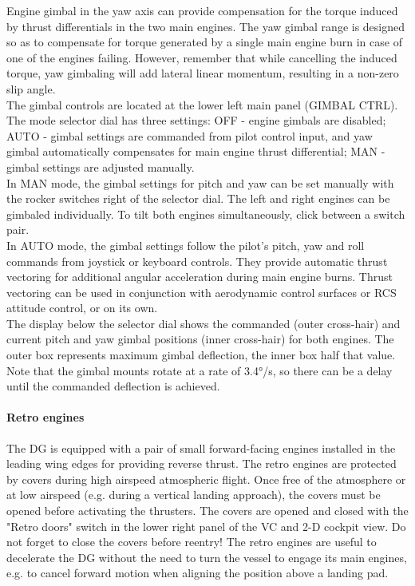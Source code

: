 \documentclass[Orbiter User Manual.tex]{subfiles}
\begin{document}
\noindent
Engine gimbal in the yaw axis can provide compensation for the torque induced by thrust differentials in the two main engines. The yaw gimbal range is designed so as to compensate for torque generated by a single main engine burn in case of one of the engines failing. However, remember that while cancelling the induced torque, yaw gimbaling will add lateral linear momentum, resulting in a non-zero slip angle.\\
The gimbal controls are located at the lower left main panel (GIMBAL CTRL). The mode selector dial has three settings: OFF - engine gimbals are disabled; AUTO - gimbal settings are commanded from pilot control input, and yaw gimbal automatically compensates for main engine thrust differential; MAN - gimbal settings are adjusted manually.\\
In MAN mode, the gimbal settings for pitch and yaw can be set manually with the rocker switches right of the selector dial. The left and right engines can be gimbaled individually. To tilt both engines simultaneously, click between a switch pair.\\
In AUTO mode, the gimbal settings follow the pilot's pitch, yaw and roll commands from joystick or keyboard controls. They provide automatic thrust vectoring for additional angular acceleration during main engine burns. Thrust vectoring can be used in conjunction with aerodynamic control surfaces or RCS attitude control, or on its own.\\
The display below the selector dial shows the commanded (outer cross-hair) and current pitch and yaw gimbal positions (inner cross-hair) for both engines. The outer box represents maximum gimbal deflection, the inner box half that value. Note that the gimbal mounts rotate at a rate of 3.4°/s, so there can be a delay until the commanded deflection is achieved.

\paragraph{Retro engines}
The DG is equipped with a pair of small forward-facing engines installed in the leading wing edges for providing reverse thrust. The retro engines are protected by covers during high airspeed atmospheric flight. Once free of the atmosphere or at low airspeed (e.g. during a vertical landing approach), the covers must be opened before activating the thrusters. The covers are opened and closed with the "Retro doors" switch in the lower right panel of the VC and 2-D cockpit view. Do not forget to close the covers before reentry! The retro engines are useful to decelerate the DG without the need to turn the vessel to engage its main engines, e.g. to cancel forward motion when aligning the position above a landing pad.
\end{document}
